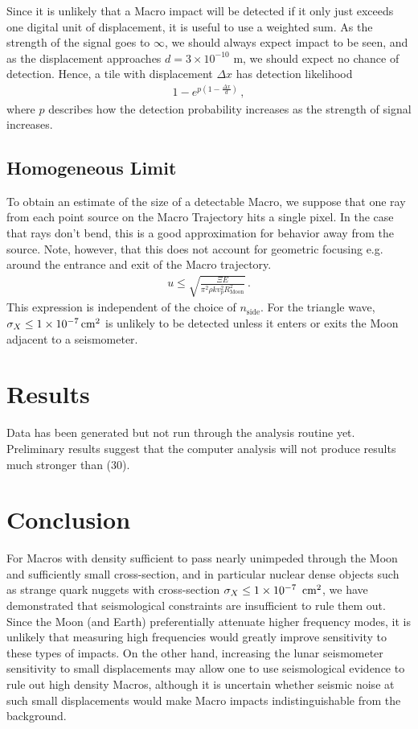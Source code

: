 \documentclass[prd,reprint,10pt]{revtex4-1}
\newcommand*\te[1]{\text{#1}}
\newcommand*\f[2]{\frac{#1}{#2}}
\begin{document}
Since it is unlikely that a Macro impact will be detected if it only just exceeds one digital unit of displacement, it is useful to use a weighted sum. As the strength of the signal goes to $\infty$, we should always expect impact to be seen, and as the displacement approaches $d = 3\times 10^{-10}\te{ m}$, we should expect no chance of detection. Hence, a tile with displacement $\Delta x$ has detection likelihood
\begin{align}
1-e^{p(1-\f{\Delta x}{d})}\,,
\end{align}
where $p$ describes how the detection probability increases as the strength of signal increases.
\subsection{Homogeneous Limit}
To obtain an estimate of the size of a detectable Macro, we suppose that one ray from each point source on the Macro Trajectory hits a single pixel. In the case that rays don't bend, this is a good approximation for behavior away from the source. Note, however, that this does not account for geometric focusing e.g. around the entrance and exit of the Macro trajectory.
\begin{align}
u\leq\sqrt{\f{\Xi E}{\pi^2\rho k v_p^2 R_\te{Moon}^2}}\,.
\end{align}
This expression is independent of the choice of $n_\te{side}$. For the triangle wave, $\sigma_X\leq 1\times 10^{-7}\te{\,cm}^2$ is unlikely to be detected unless it enters or exits the Moon adjacent to a seismometer.
\section{Results}
Data has been generated but not run through the analysis routine yet. Preliminary results suggest that the computer analysis will not produce results much stronger than (30).
\section{Conclusion}
For Macros with density sufficient to pass nearly unimpeded through the Moon and sufficiently small cross-section, and in particular nuclear dense objects such as strange quark nuggets with cross-section $\sigma_X\leq 1\times 10^{-7}\te{\, cm}^2$, we have demonstrated that seismological constraints are insufficient to rule them out. Since the Moon (and Earth) preferentially attenuate higher frequency modes, it is unlikely that measuring high frequencies would greatly improve sensitivity to these types of impacts. On the other hand, increasing the lunar seismometer sensitivity to small displacements may allow one to use seismological evidence to rule out high density Macros, although it is uncertain whether seismic noise at such small displacements would make Macro impacts indistinguishable from the background.
\end{document}
